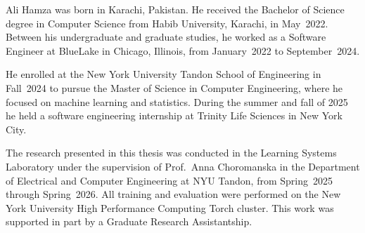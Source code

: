 

Ali Hamza was born in Karachi, Pakistan. He received the Bachelor of Science degree in Computer Science from Habib University, Karachi, in May~2022. Between his undergraduate and graduate studies, he worked as a Software Engineer at BlueLake in Chicago, Illinois, from January~2022 to September~2024. 

He enrolled at the New York University Tandon School of Engineering in Fall~2024 to pursue the Master of Science in Computer Engineering, where he focused on machine learning and statistics. During the summer and fall of 2025 he held a software engineering internship at Trinity Life Sciences in New York City.

The research presented in this thesis was conducted in the Learning Systems Laboratory under the supervision of Prof.~Anna Choromanska in the Department of Electrical and Computer Engineering at NYU Tandon, from Spring~2025 through Spring~2026. All training and evaluation were performed on the New York University High Performance Computing Torch cluster. This work was supported in part by a Graduate Research Assistantship.